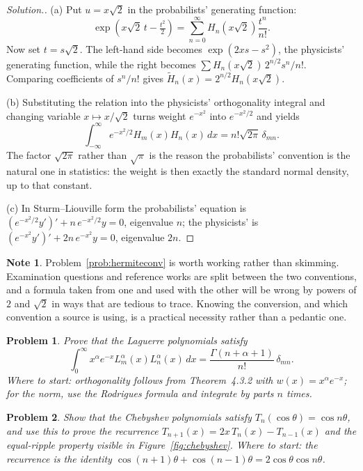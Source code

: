 \documentclass[12pt,a4paper]{report}
\theoremstyle{definition}
\newtheorem{note}[thm]{Note}
\theoremstyle{plain}
\newtheorem{problemx}{Problem}[section]
\newenvironment{problem}{\begin{problemx}}{\end{problemx}}
\newenvironment{solution}
  {\renewcommand{\qedsymbol}{}\begin{proof}[\textit{Solution}.]}
  {\end{proof}}
\begin{document}
\begin{solution}
(a) Put $u = x\sqrt2$ in the probabilists' generating function:
$$\exp\left(x\sqrt2\,t - \tfrac{t^{2}}{2}\right)
= \sum^{\infty}_{n=0}H_n\!\left(x\sqrt2\right)\frac{t^{n}}{n!}.$$
Now set $t = s\sqrt2$. The left-hand side becomes
$\exp\left(2xs - s^{2}\right)$, the physicists' generating function, while the
right becomes $\sum H_n(x\sqrt2)\,2^{n/2}s^{n}/n!$. Comparing coefficients of
$s^{n}/n!$ gives $\widetilde{H}_n(x) = 2^{n/2}H_n(x\sqrt2)$.

(b) Substituting the relation into the physicists' orthogonality integral and
changing variable $x\mapsto x/\sqrt2$ turns weight $e^{-x^{2}}$ into
$e^{-x^{2}/2}$ and yields
$$\int^{\infty}_{-\infty}e^{-x^{2}/2}H_m(x)H_n(x)\,dx = n!\sqrt{2\pi}\,\delta_{mn}.$$
The factor $\sqrt{2\pi}$ rather than $\sqrt{\pi}$ is the reason the
probabilists' convention is the natural one in statistics: the weight is then
exactly the standard normal density, up to that constant.

(c) In Sturm--Liouville form the probabilists' equation is
$\left(e^{-x^{2}/2}y'\right)'+n\,e^{-x^{2}/2}y=0$, eigenvalue $n$; the
physicists' is $\left(e^{-x^{2}}y'\right)'+2n\,e^{-x^{2}}y=0$, eigenvalue $2n$.
\end{solution}

\begin{note}
Problem~\ref{prob:hermiteconv} is worth working rather than skimming. Examination
questions and reference works are split between the two conventions, and a
formula taken from one and used with the other will be wrong by powers of $2$
and $\sqrt2$ in ways that are tedious to trace. Knowing the conversion, and
which convention a source is using, is a practical necessity rather than a
pedantic one.
\end{note}

\begin{problem}
Prove that the Laguerre polynomials satisfy
$$\int^{\infty}_{0}x^{\alpha}e^{-x}L^{\alpha}_m(x)L^{\alpha}_n(x)\,dx
= \frac{\Gamma(n+\alpha+1)}{n!}\,\delta_{mn}.$$
\emph{Where to start: orthogonality follows from Theorem~4.3.2 with
$w(x)=x^{\alpha}e^{-x}$; for the norm, use the Rodrigues formula and integrate
by parts $n$ times.}
\end{problem}

\begin{problem}
Show that the Chebyshev polynomials satisfy $T_n(\cos\theta)=\cos n\theta$, and
use this to prove the recurrence
$T_{n+1}(x) = 2x\,T_n(x)-T_{n-1}(x)$ and the equal-ripple property visible in
Figure~\ref{fig:chebyshev}.
\emph{Where to start: the recurrence is the identity
$\cos(n+1)\theta + \cos(n-1)\theta = 2\cos\theta\cos n\theta$.}
\end{problem}
\end{document}
